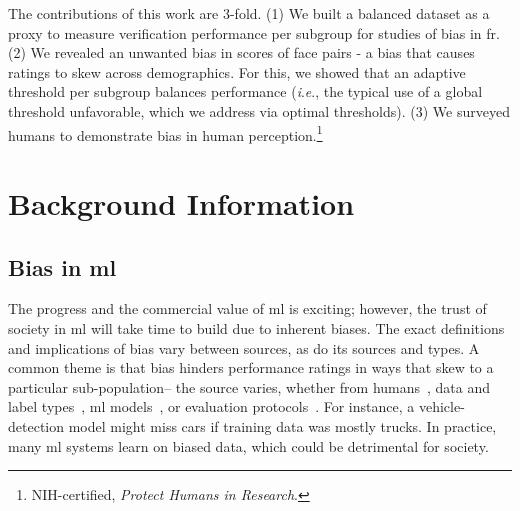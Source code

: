 \documentclass[10pt,twocolumn,letterpaper]{article}
\newcommand{\ie}{\textit{i}.\textit{e}., }
\begin{document}
    
    The contributions of this work are 3-fold. (1) We built a balanced dataset as a proxy to measure verification performance per subgroup for studies of bias in \gls{fr}. (2) We revealed an unwanted bias in scores of face pairs - a bias that causes ratings to skew across demographics. For this, we showed that an adaptive threshold per subgroup balances performance (\ie the typical use of a global threshold unfavorable, which we address via optimal thresholds). (3) We surveyed humans to demonstrate bias in human perception.\footnote{NIH-certified, \textit{Protect Humans in Research}.}%


\section{Background Information}
    \subsection{Bias in \gls{ml}}
        The progress and the commercial value of \gls{ml} is exciting; however, the trust of society in \gls{ml} will take time to build due to inherent biases. The exact definitions and implications of bias vary between sources, as do its sources and types. A common theme is that bias hinders performance ratings in ways that skew to a particular sub-population-- the source varies, whether from humans~\cite{windmann1998subconscious}, data and label types~\cite{tommasi2017deeper}, \gls{ml} models~\cite{amini2019uncovering, kim2019learning}, or evaluation protocols~\cite{stock2018convnets}. For instance, a vehicle-detection model might miss cars if training data was mostly trucks. In practice, many \gls{ml} systems learn on biased data, which could be detrimental for society. 
\end{document}
